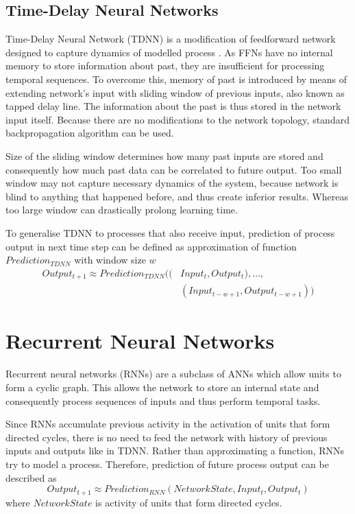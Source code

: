 \documentclass[12pt,oneside]{fithesis2}
\begin{document}

\subsection{Time-Delay Neural Networks}
Time-Delay Neural Network (TDNN) is a modification of feedforward network designed to capture dynamics of modelled process \cite{phoneme-recognition-tdnn}. As FFNs have no internal memory to store information about past, they are insufficient for processing temporal sequences. To overcome this, memory of past is introduced by means of extending network's input with sliding window of previous inputs, also known as tapped delay line. The information about the past is thus stored in the network input itself. Because there are no modifications to the network topology, standard backpropagation algorithm can be used.\par
Size of the sliding window determines how many past inputs are stored and consequently how much past data can be correlated to future output. Too small window may not capture necessary dynamics of the system, because network is blind to anything that happened before, and thus create inferior results. Whereas too large window can drastically prolong learning time.\par
To generalise TDNN to processes that also receive input, prediction of process output in next time step can be defined as approximation of function $Prediction_{TDNN}$ with window size $w$
	\[
		\begin{split}
		Output_{t+1} \approx Prediction_{TDNN}((&Input_t,Output_t), \dots, \\
										&(Input_{t-w+1},Output_{t-w+1}))
		\end{split}
	\]
	
\section{Recurrent Neural Networks}
Recurrent neural networks (RNNs) are a subclass of ANNs which allow units to form a cyclic graph. This allows the network to store an internal state and consequently process sequences of inputs and thus perform temporal tasks. \par
Since RNNs accumulate previous activity in the activation of units that form directed cycles, there is no need to feed the network with history of previous inputs and outputs like in TDNN. Rather than approximating a function, RNNs try to model a process. Therefore, prediction of future process output can be described as
$$Output_{t+1} \approx Prediction_{RNN}\left(NetworkState, Input_t,Output_t\right)$$
where $NetworkState$ is activity of units that form directed cycles.
\end{document}
